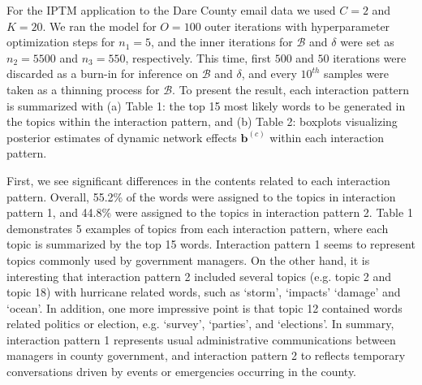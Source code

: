 \documentclass[a4paper]{article}
\begin{document}
For the IPTM application to the Dare County email data we used $C=2$ and $K=20$. We ran the model for $O=100$ outer iterations with hyperparameter optimization steps for $n_1=5$, and the inner iterations for $\mathcal{B}$ and $\delta$ were set as $n_2=5500$ and $n_3 = 550$, respectively. This time, first $500$ and $50$ iterations were discarded as a burn-in for inference on  $\mathcal{B}$ and $\delta$, and every $10^{th}$ samples were taken as a thinning process for $\mathcal{B}$. To present the result, each interaction pattern is summarized with (a) Table 1: the top 15 most likely words to be generated in the topics within the interaction pattern, and (b) Table 2: boxplots visualizing posterior estimates of dynamic network effects $\boldsymbol{b}^{(c)}$ within each interaction pattern.
          	
First, we see significant differences in the contents related to each interaction pattern. Overall, 55.2\% of the words were assigned to the topics in interaction pattern 1, and 44.8\% were assigned to the topics in interaction pattern 2. Table 1 demonstrates 5 examples of topics from each interaction pattern, where each topic is summarized by the top 15 words. Interaction pattern 1 seems to represent topics commonly used by government managers. On the other hand, it is interesting that interaction pattern 2 included several topics (e.g. topic 2 and topic 18) with hurricane related words, such as `storm', `impacts' `damage' and `ocean'. In addition, one more impressive point is that topic 12 contained words related politics or election, e.g. `survey', `parties', and `elections'. In summary, interaction pattern 1 represents usual administrative communications between managers in county government, and interaction pattern 2 to reflects temporary conversations driven by events or emergencies occurring in the county.
\end{document}
